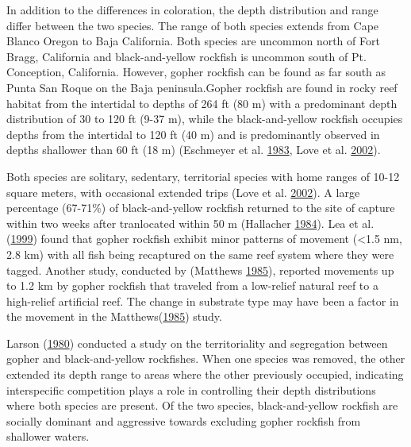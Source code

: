 \documentclass[12pt,]{article}
\begin{document}
In addition to the differences in coloration, the depth distribution and
range differ between the two species. The range of both species extends
from Cape Blanco Oregon to Baja California. Both species are uncommon
north of Fort Bragg, California and black-and-yellow rockfish is
uncommon south of Pt. Conception, California. However, gopher rockfish
can be found as far south as Punta San Roque on the Baja
peninsula.Gopher rockfish are found in rocky reef habitat from the
intertidal to depths of 264 ft (80 m) with a predominant depth
distribution of 30 to 120 ft (9-37 m), while the black-and-yellow
rockfish occupies depths from the intertidal to 120 ft (40 m) and is
predominantly observed in depths shallower than 60 ft (18 m) (Eschmeyer
et al. \protect\hyperlink{ref-Eschmeyer1983}{1983}, Love et al.
\protect\hyperlink{ref-Love2002}{2002}).

Both species are solitary, sedentary, territorial species with home
ranges of 10-12 square meters, with occasional extended trips (Love et
al. \protect\hyperlink{ref-Love2002}{2002}). A large percentage
(67-71\%) of black-and-yellow rockfish returned to the site of capture
within two weeks after tranlocated within 50 m (Hallacher
\protect\hyperlink{ref-Hallacher1984}{1984}). Lea et al.
(\protect\hyperlink{ref-Lea1999}{1999}) found that gopher rockfish
exhibit minor patterns of movement (\textless{}1.5 nm, 2.8 km) with all
fish being recaptured on the same reef system where they were tagged.
Another study, conducted by (Matthews
\protect\hyperlink{ref-Matthews1985}{1985}), reported movements up to
1.2 km by gopher rockfish that traveled from a low-relief natural reef
to a high-relief artificial reef. The change in substrate type may have
been a factor in the movement in the
Matthews(\protect\hyperlink{ref-Matthews1985}{1985}) study.

Larson (\protect\hyperlink{ref-Larson1980}{1980}) conducted a study on
the territoriality and segregation between gopher and black-and-yellow
rockfishes. When one species was removed, the other extended its depth
range to areas where the other previously occupied, indicating
interspecific competition plays a role in controlling their depth
distributions where both species are present. Of the two species,
black-and-yellow rockfish are socially dominant and aggressive towards
excluding gopher rockfish from shallower waters.
\end{document}
